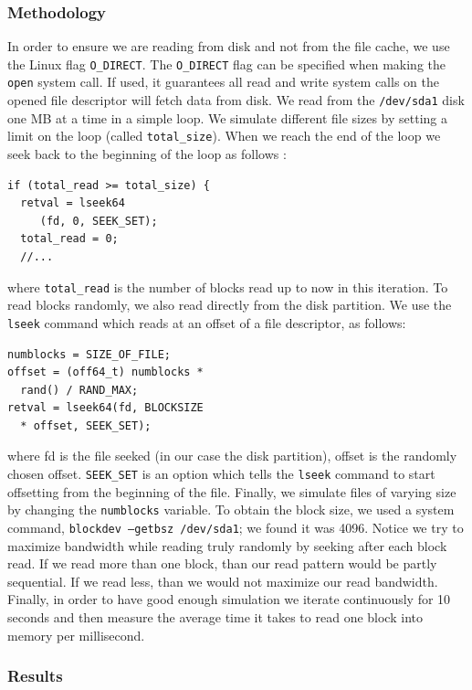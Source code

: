 \subsubsection{Methodology}

In order to ensure we are reading from disk and not from the file cache, we use the Linux flag \texttt{O\_DIRECT}. The \texttt{O\_DIRECT} flag can be specified when making the \texttt{open} system call. If used, it guarantees all read and write system calls on the opened file descriptor will fetch data from disk. We read from the \texttt{/dev/sda1} disk one MB at a time in a simple loop. We simulate different file sizes by setting a limit on the loop (called \texttt{total\_size}). When we reach the end of the loop we seek back to the beginning of the loop as follows : 

\begin{lstlisting}
if (total_read >= total_size) {
  retval = lseek64
     (fd, 0, SEEK_SET);
  total_read = 0;
  //...
\end{lstlisting}

where \texttt{total\_read} is the number of blocks read up to now in this iteration. To read blocks randomly, we also read directly from the disk partition. We use the \texttt{lseek} command which reads at an offset of a file descriptor, as follows:

\begin{lstlisting}
numblocks = SIZE_OF_FILE;
offset = (off64_t) numblocks *
  rand() / RAND_MAX;
retval = lseek64(fd, BLOCKSIZE 
  * offset, SEEK_SET);
\end{lstlisting}

where fd is the file seeked (in our case the disk partition), offset is the randomly chosen offset. \texttt{SEEK\_SET} is an option which tells the \texttt{lseek} command to start offsetting from the beginning of the file. Finally, we simulate files of varying size by changing the \texttt{numblocks} variable. To obtain the block size, we used a system command, \texttt{blockdev --getbsz /dev/sda1}; we found it was 4096. Notice we try to maximize bandwidth while reading truly randomly by seeking after each block read. If we read more than one block, than our read pattern would be partly sequential. If we read less, than we would not maximize our read bandwidth. Finally, in order to have good enough simulation we iterate continuously for 10 seconds and then measure the average time it takes to read one block into memory per millisecond.

\subsubsection{Results}

